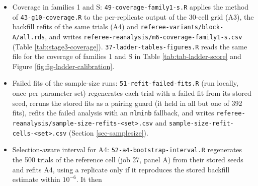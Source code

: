 \documentclass[
  11pt,
]{article}
\begin{document}
\begin{itemize}
  driver \texttt{19-g9-planning-and-fig4b.R} and writes
  \texttt{sample-size-reconcile.csv}. Table S13 reads that driver's
  \texttt{n80-g10.csv} in \texttt{published-planning/block-N/},
  \texttt{published-planning/rho0.5/block-N/} and
  \texttt{published-planning/rho0.9/block-N/}; Table S15 reads its
  \texttt{published-planning/planning-g10.csv}. These runs are not reported
  in the companion paper. The size check at large \(N\) is the same
  driver with \texttt{-\/-null} (1,000 replicates per cell), run as six simrun
  jobs on 2026-11-14 at commit \texttt{7fd5465} (zeus 68 and 69, mercury 55,
  athena 23, joe 16 and 17), writing
  \texttt{carryover-sensitivity/sample-size-null-\textless{}set\textgreater{}-\textless{}design\textgreater{}/}. Two
  OL+BDC jobs at commit \texttt{3371920} add \texttt{-\/-null-n\ 480} (joe 18) and
  \texttt{-\/-null-n\ 1012} under parameter set 1 (zeus 70), writing
  \texttt{sample-size-null-\textless{}set\textgreater{}-OLBDC-N\textless{}N\textgreater{}/}. A Hybrid job at commit
  \texttt{f548b0f} adds \texttt{-\/-null-n\ 600} under parameter set 2 (zeus 71),
  writing \texttt{sample-size-null-simcore2026-Hybrid-N600/}.
\item
  Coverage in families 1 and S: \texttt{49-coverage-family1-s.R} applies the
  method of \texttt{43-g10-coverage.R} to the per-replicate output of the
  30-cell grid (A3), the backfill refits of the same trials (A4) and
  \texttt{referee-variants/block-A/all.rds}, and writes
  \texttt{referee-reanalysis/m6-coverage-family1-s.csv} (Table
  \ref{tab:stage3-coverage}). \texttt{37-ladder-tables-figures.R} reads the
  same file for the coverage of families 1 and S in Table
  \ref{tab:tab-ladder-score} and Figure
  \ref{fig:fig-ladder-calibration}.
\item
  Failed fits of the sample-size runs: \texttt{51-refit-failed-fits.R}
  (run locally, once per parameter set) regenerates each trial with a
  failed fit from its stored seed, reruns the stored fits as a pairing
  guard (it held in all but one of
  392 fits), refits the
  failed analysis with an \texttt{nlminb} fallback, and writes
  \texttt{referee-reanalysis/sample-size-refits-\textless{}set\textgreater{}.csv} and
  \texttt{sample-size-refit-cells-\textless{}set\textgreater{}.csv} (Section
  \ref{sec-samplesize}).
\item
  Selection-aware interval for A4: \texttt{52-a4-bootstrap-interval.R}
  regenerates the 500 trials of the reference cell (job 27, panel A)
  from their stored seeds and refits A4, using a replicate only if it
  reproduces the stored backfill estimate within \(10^{-6}\). It then

\end{itemize}
\end{document}
